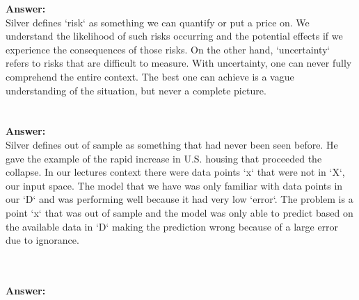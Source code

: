 \documentclass[12pt]{article}
\begin{document}
\begin{enumerate}
\textbf{Answer:} \\
Silver defines `risk` as something we can quantify or put a price on. We understand the likelihood of such risks occurring and the potential effects if we experience the consequences of those risks. On the other hand, `uncertainty` refers to risks that are difficult to measure. With uncertainty, one can never fully comprehend the entire context. The best one can achieve is a vague understanding of the situation, but never a complete picture. \\ 
 \\ \\
\textbf{Answer: } \\
Silver defines out of sample as something that had never been seen before. He gave the example of the rapid increase in U.S. housing that proceeded the collapse. In our lectures context there were data points `x` that were not in `X`, our input space. The model that we have was only familiar with data points in our `D` and was performing well because it had very low `error`. The problem is a point `x` that was out of sample and the model was only able to predict based on the available data in `D` making the prediction wrong because of a large error due to  ignorance. 

\\

\\

\textbf{Answer:} \\ 


\end{enumerate}
\end{document}
